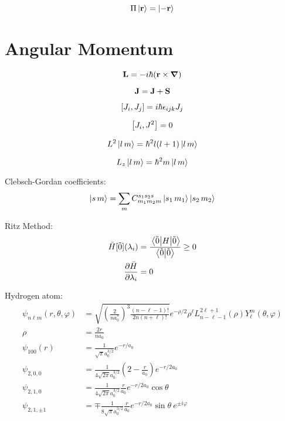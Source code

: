\documentclass[a4paper, twocolumn]{article}
\begin{document}

\begin{equation*}
    \Pi \ket{\vb{r}} = \ket{-\vb{r}}
\end{equation*}

\section{Angular Momentum}

\begin{equation*}
    \vb{L} = -i \hbar ( \vb{r} \times \grad )
\end{equation*}

\begin{equation*}
    \vb{J} = \vb{J} + \vb{S}
\end{equation*}

\begin{equation*}
    \comm{J_{i}}{J_{j}} = i \hbar \epsilon_{ijk} J_{j}
\end{equation*}

\begin{equation*}
    \comm{J_{i}}{J^{2}} = 0
\end{equation*}

\begin{equation*}
    L^{2} \ket{l\,m} = \hbar^{2} l(l+1) \ket{l\,m}
\end{equation*}

\begin{equation*}
    L_z \ket{l\,m} = \hbar^{2} m \ket{l\,m}
\end{equation*}

Clebsch-Gordan coefficients:
\begin{equation*}
    \ket{s\,m} = \sum\limits_{m} C_{m_1 m_2 m}^{s_1 s_2 s} \ket{s_1\,m_1}\ket{s_2\,m_2}
\end{equation*}


Ritz Method:
\begin{align*}
    \bar{H}[\tilde{0}](\lambda_i) &= \frac{ \expval{H}{\tilde{0}} }{ \braket{\tilde{0}} } \ge 0 \\
    \pdv{\bar{H}}{\lambda_i} &= 0
\end{align*}

Hydrogen atom:
\begin{align*}
    \psi_{n \ell m}(r, \theta, \varphi) &= \sqrt{{\left( \frac{2}{n a^*_0} \right)}^3 \frac{(n - \ell - 1)!}{2 n (n + \ell)!}} e^{-\rho / 2} \rho^{\ell} L_{n - \ell - 1}^{2 \ell + 1}(\rho) Y_\ell^m (\theta, \varphi) \\
    \rho &= \frac{ 2r }{n a_0} \\
    \psi_{1 0 0} (r) &= \frac{1}{\sqrt{\pi} a_0^{3 / 2}} e^{-r / a_0} \\
    \psi_{2, 0, 0} &= \frac{1}{4 \sqrt{2 \pi} a_0^{3 / 2}} \left( 2 - \frac{r}{a_0} \right) e^{-r / 2 a_0} \\
    \psi_{2, 1, 0} &= \frac{1}{4 \sqrt{2 \pi} a_0^{3 / 2}} \frac{r}{a_0} e^{-r / 2 a_0} \cos \theta \\
    \psi_{2, 1, \pm 1} &= \mp \frac{1}{8 \sqrt{\pi} a_0^{3/2}} \frac{r}{a_0} e^{-r / 2 a_0} \sin \theta ~ e^{\pm i \varphi}
\end{align*}
\end{document}
